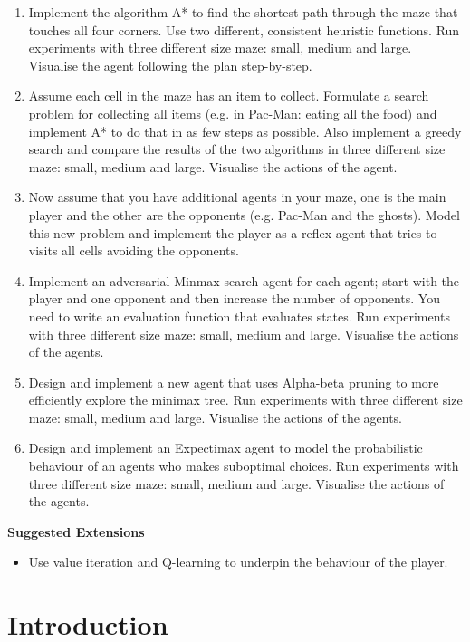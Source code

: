 \documentclass[]{final_report}
\begin{document}
\begin{minipage}{\textwidth}
\begin{enumerate}
    \item Implement the algorithm A* to find the shortest path through the maze that touches all four corners. Use two different, consistent heuristic functions. Run experiments with three different size maze: small, medium and large. Visualise the agent following the plan step-by-step.
    \item Assume each cell in the maze has an item to collect. Formulate a search problem for collecting all items (e.g. in Pac-Man: eating all the food) and implement A* to do that in as few steps as possible. Also implement a greedy search and compare the results of the two algorithms in three different size maze: small, medium and large. Visualise the actions of the agent.
    \item Now assume that you have additional agents in your maze, one is the main player and the other are the opponents (e.g. Pac-Man and the ghosts). Model this new problem and implement the player as a reflex agent that tries to visits all cells avoiding the opponents.
    \item Implement an adversarial Minmax search agent for each agent; start with the player and one opponent and then increase the number of opponents. You need to write an evaluation function that evaluates states. Run experiments with three different size maze: small, medium and large. Visualise the actions of the agents.
    \item Design and implement a new agent that uses Alpha-beta pruning to more efficiently explore the minimax tree. Run experiments with three different size maze: small, medium and large. Visualise the actions of the agents.
    \item Design and implement an Expectimax agent to model the probabilistic behaviour of an agents who makes suboptimal choices. Run experiments with three different size maze: small, medium and large. Visualise the actions of the agents.
\end{enumerate}

\textbf{Suggested Extensions}
\begin{itemize}
    \item Use value iteration and Q-learning to underpin the behaviour of the player.
\end{itemize}
\end{minipage}

\chapter{Introduction}
\end{document}
